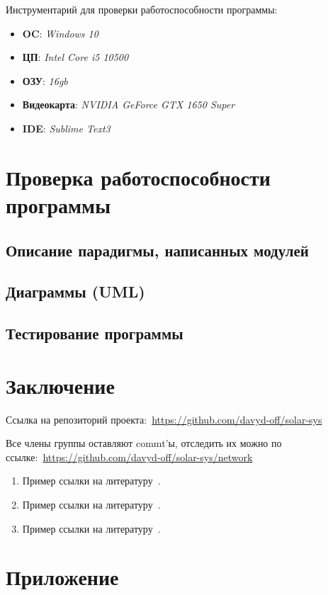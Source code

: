 \documentclass[14pt, oneside]{altsu-report}
\begin{document}
Инструментарий для проверки работоспособности программы:
    \begin{itemize}
        \item \textbf{OC}: \textit{Windows 10}
        \item \textbf{ЦП}: \textit{Intel Core i5 10500}
        \item \textbf{ОЗУ}: \textit{16gb}
        \item \textbf{Видеокарта}: \textit{NVIDIA GeForce GTX 1650 Super}
        \item \textbf{IDE}: \textit{Sublime Text3}
    \end{itemize}


\chapter{Проверка работоспособности программы}\label{ch2}
\section{Описание парадигмы, написанных модулей}
\section{Диаграммы (UML)}
\section{Тестирование программы}

\chapter*{Заключение}
Ссылка на репозиторий проекта:~\textcolor{blue}{\url{https://github.com/davyd-off/solar-sys}}

Все члены группы оставляют commt'ы, отследить их можно по ссылке:~\textcolor{blue}{\url{https://github.com/davyd-off/solar-sys/network}}


\begin{enumerate}
\item Пример ссылки на литературу~\cite{wikiRUBitbucket}.
\item Пример ссылки на литературу~\cite{wikiRUIdSoftware}.
\item Пример ссылки на литературу~\cite{wikiRUGitHub}.
\end{enumerate}

\newpage
{}
\printbibliography[title={Список использованной литературы}]

\newpage
\chapter*{Приложение}

\begin{code}
\label{code:solar-sys}
\inputminted[mathescape,linenos,frame=lines,breaklines]{Python}{src/main.py}
\end{code}
\end{document}
